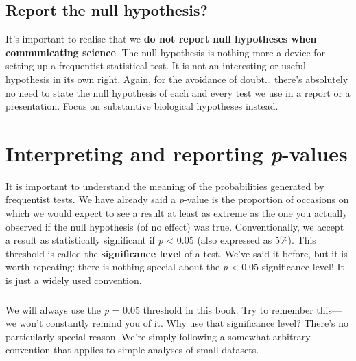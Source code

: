 \documentclass[
]{book}
\newenvironment{greybox}{
  \definecolor{shadecolor}{rgb}{0.95,0.95,0.95}  %
  \color{black}
  \begin{shaded}}
 {\end{shaded}}
\newenvironment{infobox}[1]
  {
  \begin{itemize}
  \renewcommand{\labelitemi}{
    \raisebox{-.7\height}[0pt][0pt]{
      {\setkeys{Gin}{width=3em,keepaspectratio}
        \texttt{[image: images/\#1]}}
    }
  }
  \setlength{\fboxsep}{1em}
  \begin{greybox}
  \item
  }
  {
  \end{greybox}
  \end{itemize}
  }
\begin{document}
\hypertarget{report-the-null-hypothesis}{%
\subsection{Report the null hypothesis?}\label{report-the-null-hypothesis}}

It's important to realise that we \textbf{do not report null hypotheses when communicating science}. The null hypothesis is nothing more a device for setting up a frequentist statistical test. It is not an interesting or useful hypothesis in its own right. Again, for the avoidance of doubt\ldots{} there's absolutely no need to state the null hypothesis of each and every test we use in a report or a presentation. Focus on substantive biological hypotheses instead.

\hypertarget{interpreting-and-reporting-p-values}{%
\section{\texorpdfstring{Interpreting and reporting \emph{p}-values}{Interpreting and reporting p-values}}\label{interpreting-and-reporting-p-values}}

It is important to understand the meaning of the probabilities generated by frequentist tests. We have already said a \emph{p}-value is the proportion of occasions on which we would expect to see a result at least as extreme as the one you actually observed if the null hypothesis (of no effect) was true. Conventionally, we accept a result as statistically significant if \emph{p} \textless{} 0.05 (also expressed as 5\%). This threshold is called the \textbf{significance level} of a test. We've said it before, but it is worth repeating: there is nothing special about the \emph{p} \textless{} 0.05 significance level! It is just a widely used convention.

\begin{infobox}{warning}

\hypertarget{section-2}{%
\subsubsection*{}\label{section-2}}

We will always use the \emph{p} = 0.05 threshold in this book. Try to remember this---we won't constantly remind you of it. Why use that significance level? There's no particularly special reason. We're simply following a somewhat arbitrary convention that applies to simple analyses of small datasets.

\end{infobox}
\end{document}
